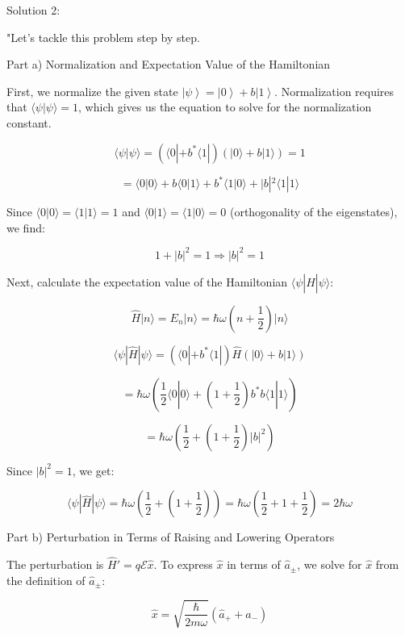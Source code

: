 Solution 2:

"Let's tackle this problem step by step.

Part a) Normalization and Expectation Value of the Hamiltonian

First, we normalize the given state \( \left| \psi \right> = \left| 0 \right> + b \left| 1 \right> \). Normalization requires that \( \langle \psi | \psi \rangle = 1 \), which gives us the equation to solve for the normalization constant.

\[
\langle \psi | \psi \rangle = \left( \langle 0 | + b^* \langle 1 | \right)\left( | 0 \rangle + b | 1 \rangle \right) = 1
\]

\[
= \langle 0 | 0 \rangle + b \langle 0 | 1 \rangle + b^* \langle 1 | 0 \rangle + |b|^2 \langle 1 | 1 \rangle
\]

Since \( \langle 0 | 0 \rangle = \langle 1 | 1 \rangle = 1 \) and \( \langle 0 | 1 \rangle = \langle 1 | 0 \rangle = 0 \) (orthogonality of the eigenstates), we find:

\[
1 + |b|^2 = 1 \Rightarrow |b|^2 = 1
\]

Next, calculate the expectation value of the Hamiltonian \( \langle \psi | \hat{H} | \psi \rangle \):

\[
\hat{H} | n \rangle = E_n | n \rangle = \hbar \omega \left( n + \frac{1}{2} \right) | n \rangle
\]

\[
\langle \psi | \hat{H} | \psi \rangle = \left( \langle 0 | + b^* \langle 1 | \right) \hat{H} \left( | 0 \rangle + b | 1 \rangle \right)
\]

\[
= \hbar\omega\left( \frac{1}{2} \langle 0 | 0 \rangle + \left( 1 + \frac{1}{2} \right) b^*b \langle 1 | 1 \rangle \right)
\]

\[
= \hbar\omega\left( \frac{1}{2} + \left( 1 + \frac{1}{2} \right) |b|^2 \right)
\]

Since \( |b|^2 = 1 \), we get:

\[
\langle \psi | \hat{H} | \psi \rangle = \hbar\omega\left( \frac{1}{2} + \left( 1 + \frac{1}{2} \right) \right) = \hbar\omega\left( \frac{1}{2} + 1 + \frac{1}{2} \right) = 2\hbar\omega
\]

Part b) Perturbation in Terms of Raising and Lowering Operators

The perturbation is \( \hat{H}' = q \mathcal{E} \hat{x} \). To express \( \hat{x} \) in terms of \( \hat{a}_{\pm} \), we solve for \( \hat{x} \) from the definition of \( \hat{a}_{\pm} \):

\[
\hat{x} = \sqrt{\frac{\hbar}{2m\omega}}(\hat{a}_+ + \hat{a}_-)
\]

